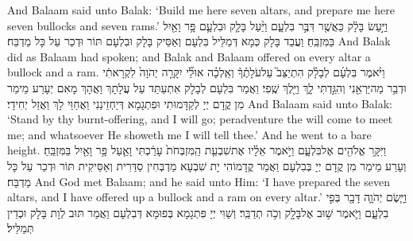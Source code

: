 {And Balaam said unto Balak: ‘Build me here seven altars, and prepare me here seven bullocks and seven rams.’}{}
{וַיַּ֣עַשׂ בָּלָ֔ק כַּאֲשֶׁ֖ר דִּבֶּ֣ר בִּלְעָ֑ם וַיַּ֨עַל בָּלָ֧ק וּבִלְעָ֛ם פָּ֥ר וָאַ֖יִל בַּמִּזְבֵּֽחַ׃}
{וַעֲבַד בָּלָק כְּמָא דְּמַלֵּיל בִּלְעָם וְאַסֵּיק בָּלָק וּבִלְעָם תּוֹר וּדְכַר עַל כָּל מַדְבַּח׃}
{And Balak did as Balaam had spoken; and Balak and Balaam offered on every altar a bullock and a ram.}{}
{וַיֹּ֨אמֶר בִּלְעָ֜ם לְבָלָ֗ק הִתְיַצֵּב֮ עַל\maqqaf עֹלָתֶ֒ךָ֒ וְאֵֽלְכָ֗ה אוּלַ֞י יִקָּרֵ֤ה יְהֹוָה֙ לִקְרָאתִ֔י וּדְבַ֥ר מַה\maqqaf יַּרְאֵ֖נִי וְהִגַּ֣דְתִּי לָ֑ךְ וַיֵּ֖לֶךְ שֶֽׁפִי׃}
{וַאֲמַר בִּלְעָם לְבָלָק אִתְעַתַּד עַל עֲלָתָךְ וַאֲהָךְ מָאִם יְעָרַע מֵימַר מִן קֳדָם יְיָ לְקַדָּמוּתִי וּפִתְגָמָא דְּיַחְזֵינַנִי וַאֲחַוֵּי לָךְ וַאֲזַל יְחִידָי׃}
{And Balaam said unto Balak: ‘Stand by thy burnt-offering, and I will go; peradventure the \lord\space will come to meet me; and whatsoever He showeth me I will tell thee.’ And he went to a bare height.}{}
{וַיִּקָּ֥ר אֱלֹהִ֖ים אֶל\maqqaf בִּלְעָ֑ם וַיֹּ֣אמֶר אֵלָ֗יו אֶת\maqqaf שִׁבְעַ֤ת הַֽמִּזְבְּחֹת֙ עָרַ֔כְתִּי וָאַ֛עַל פָּ֥ר וָאַ֖יִל בַּמִּזְבֵּֽחַ׃}
{וְעָרַע מֵימַר מִן קֳדָם יְיָ בְּבִלְעָם וַאֲמַר קֳדָמוֹהִי יָת שִׁבְעָא מַדְבְּחִין סַדַּרִית וְאַסֵּיקִית תּוֹר וּדְכַר עַל כָּל מַדְבַּח׃}
{And God met Balaam; and he said unto Him: ‘I have prepared the seven altars, and I have offered up a bullock and a ram on every altar.’}{}
{וַיָּ֧שֶׂם יְהֹוָ֛ה דָּבָ֖ר בְּפִ֣י בִלְעָ֑ם וַיֹּ֛אמֶר שׁ֥וּב אֶל\maqqaf בָּלָ֖ק וְכֹ֥ה תְדַבֵּֽר׃}
{וְשַׁוִּי יְיָ פִּתְגָמָא בְּפוּמָּא דְּבִלְעָם וַאֲמַר תּוּב לְוָת בָּלָק וּכְדֵין תְּמַלֵּיל׃}
